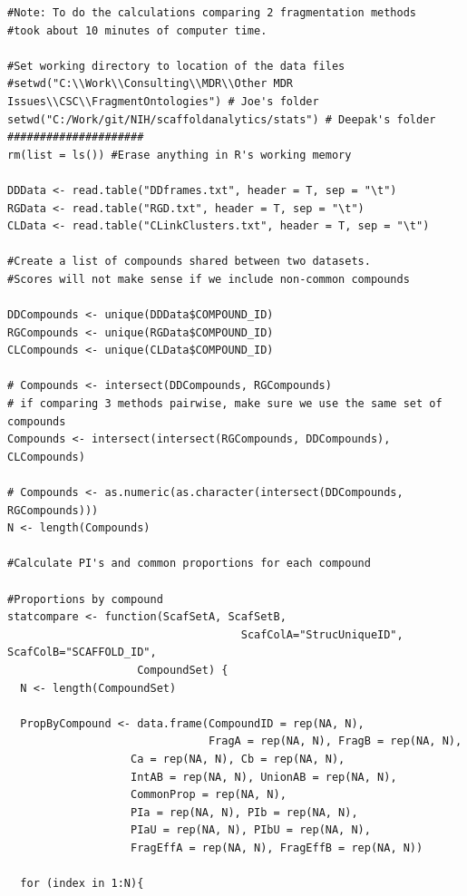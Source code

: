 \documentclass[11pt,letterpaper,biochem]{article}
\begin{document}
{\tiny
\begin{lstlisting}
#Note: To do the calculations comparing 2 fragmentation methods
#took about 10 minutes of computer time.

#Set working directory to location of the data files
#setwd("C:\\Work\\Consulting\\MDR\\Other MDR Issues\\CSC\\FragmentOntologies") # Joe's folder
setwd("C:/Work/git/NIH/scaffoldanalytics/stats") # Deepak's folder
#####################
rm(list = ls()) #Erase anything in R's working memory

DDData <- read.table("DDframes.txt", header = T, sep = "\t")
RGData <- read.table("RGD.txt", header = T, sep = "\t")
CLData <- read.table("CLinkClusters.txt", header = T, sep = "\t") 

#Create a list of compounds shared between two datasets.
#Scores will not make sense if we include non-common compounds

DDCompounds <- unique(DDData$COMPOUND_ID)
RGCompounds <- unique(RGData$COMPOUND_ID)
CLCompounds <- unique(CLData$COMPOUND_ID)  

# Compounds <- intersect(DDCompounds, RGCompounds)
# if comparing 3 methods pairwise, make sure we use the same set of compounds 
Compounds <- intersect(intersect(RGCompounds, DDCompounds), CLCompounds)

# Compounds <- as.numeric(as.character(intersect(DDCompounds, RGCompounds)))
N <- length(Compounds)

#Calculate PI's and common proportions for each compound
  
#Proportions by compound
statcompare <- function(ScafSetA, ScafSetB,
                        	        ScafColA="StrucUniqueID", ScafColB="SCAFFOLD_ID", 
			        CompoundSet) {
  N <- length(CompoundSet)
  
  PropByCompound <- data.frame(CompoundID = rep(NA, N),
                               FragA = rep(NA, N), FragB = rep(NA, N),
  			       Ca = rep(NA, N), Cb = rep(NA, N),
  			       IntAB = rep(NA, N), UnionAB = rep(NA, N),
  			       CommonProp = rep(NA, N),
  			       PIa = rep(NA, N), PIb = rep(NA, N),
  			       PIaU = rep(NA, N), PIbU = rep(NA, N),
  			       FragEffA = rep(NA, N), FragEffB = rep(NA, N))

  for (index in 1:N){
  

\end{lstlisting}}
\end{document}
